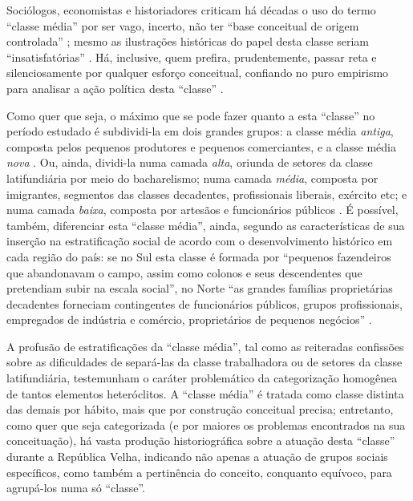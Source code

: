 Sociólogos, economistas e historiadores criticam há décadas o uso do termo ``classe média'' por ser vago, incerto, não ter ``base conceitual de origem controlada'' \cite[p.~19]{POCHMANN2014};  mesmo as ilustrações históricas do papel desta classe seriam ``insatisfatórias'' \cite[p.~9]{pinheiro_clamed_1977}. Há, inclusive, quem prefira, prudentemente, passar reta e silenciosamente por qualquer esforço conceitual, confiando no puro empirismo para analisar a ação política desta ``classe'' \cite{CARONE1970inst}.

Como quer que seja, o máximo que se pode fazer quanto a esta ``classe'' no período estudado é subdividi-la em dois grandes grupos: a classe média \textit{antiga}, composta pelos pequenos produtores e pequenos comerciantes, e a classe média \textit{nova} \cite[p.~11]{pinheiro_clamed_1977}. Ou, ainda, dividi-la numa camada \textit{alta}, oriunda de setores da classe latifundiária por meio do bacharelismo; numa camada \textit{média}, composta por imigrantes, segmentos das classes decadentes, profissionais liberais, exército etc; e numa camada \textit{baixa}, composta por artesãos e funcionários públicos \cite[p. ~175-176]{CARONE1970inst}. É possível, também, diferenciar esta ``classe média'', ainda, segundo as características de sua inserção na estratificação social de acordo com o desenvolvimento histórico em cada região do país: se no Sul esta classe é formada por ``pequenos fazendeiros que abandonavam o campo, assim como colonos e seus descendentes que pretendiam subir na escala social'', no Norte ``as grandes famílias proprietárias decadentes forneciam contingentes de funcionários públicos, grupos profissionais, empregados de indústria e comércio, proprietários de pequenos negócios''  \cite[p.~16]{pinheiro_clamed_1977}.

A profusão de estratificações da ``classe média'', tal como as reiteradas confissões sobre as dificuldades de separá-las da classe trabalhadora ou de setores da classe latifundiária, testemunham o caráter problemático da categorização homogênea de tantos elementos heteróclitos. A ``classe média'' é tratada como classe distinta das demais por hábito, mais que por construção conceitual precisa; entretanto, como quer que seja categorizada (e por maiores os problemas encontrados na sua conceituação), há vasta produção historiográfica sobre a atuação desta ``classe'' durante a República Velha, indicando não apenas a atuação de grupos sociais específicos, como também a pertinência do conceito, conquanto equívoco, para agrupá-los numa só ``classe''.

